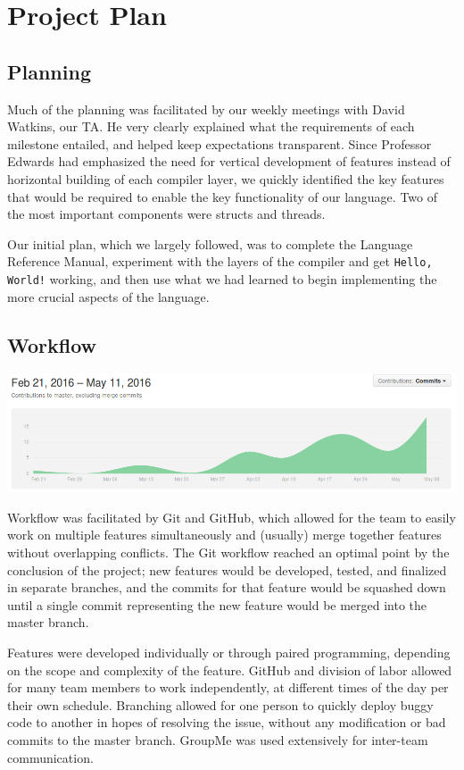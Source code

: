 \chapter{Project Plan}
	
\section{Planning}
	Much of the planning was facilitated by our weekly meetings with David Watkins, our TA. He very clearly explained what the requirements of each milestone entailed, and helped keep expectations transparent. Since Professor Edwards had emphasized the need for vertical development of features instead of horizontal building of each compiler layer, we quickly identified the key features that would be required to enable the key functionality of our language. Two of the most important components were structs and threads.

  \medskip \noindent
  Our initial plan, which we largely followed, was to complete the Language Reference Manual, experiment with the layers of the compiler and get \texttt{Hello, World!} working, and then use what we had learned to begin implementing the more crucial aspects of the language.

\section{Workflow}
 
  \begin{center}
\includegraphics[width=.9\textwidth]{img/gitlog_graph.png}
  \end{center}
  Workflow was facilitated by Git and GitHub, which allowed for the team to easily work on multiple features simultaneously and (usually) merge together features without overlapping conflicts. The Git workflow reached an optimal point by the conclusion of the project; new features would be developed, tested, and finalized in separate branches, and the commits for that feature would be squashed down until a single commit representing the new feature would be merged into the master branch.

  \medskip \noindent
  Features were developed individually or through paired programming, depending on the scope and complexity of the feature. GitHub and division of labor allowed for many team members to work independently, at different times of the day per their own schedule. Branching allowed for one person to quickly deploy buggy code to another in hopes of resolving the issue, without any modification or bad commits to the master branch. GroupMe was used extensively for inter-team communication.

